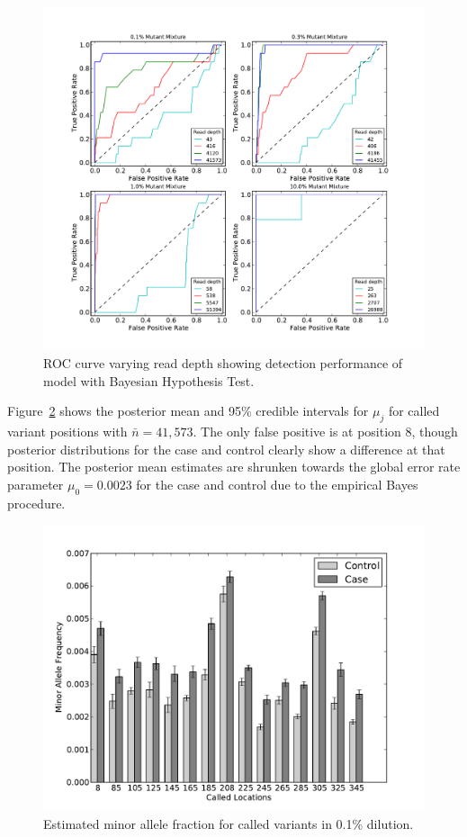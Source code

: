 \documentclass[11pt,reqno]{amsart}
\begin{document}
\begin{figure}[htbp]
\begin{center}
\includegraphics[width=120mm]{pdf_figs/ROC_without_chi2.pdf}
\caption{ROC curve varying read depth showing detection performance of model with Bayesian Hypothesis Test.}
\label{fig:ROC}
\end{center}
\end{figure}

Figure~\ref{fig:MAF} shows the posterior mean and 95\% credible intervals for $\mu_j$ for called variant positions with $\bar{n} = 41,573$. The only false positive is at position 8, though posterior distributions for the case and control clearly show a difference at that position. The posterior mean estimates are shrunken towards the global error rate parameter $\mu_0 = 0.0023$ for the case and control due to the empirical Bayes procedure.

\begin{figure}[h]
\begin{center}
\includegraphics[width=120mm]{pdf_figs/MuBarPlot.pdf}
\caption{Estimated minor allele fraction for called variants in 0.1\% dilution.}
\label{fig:MAF}
\end{center}
\end{figure}
\end{document}
